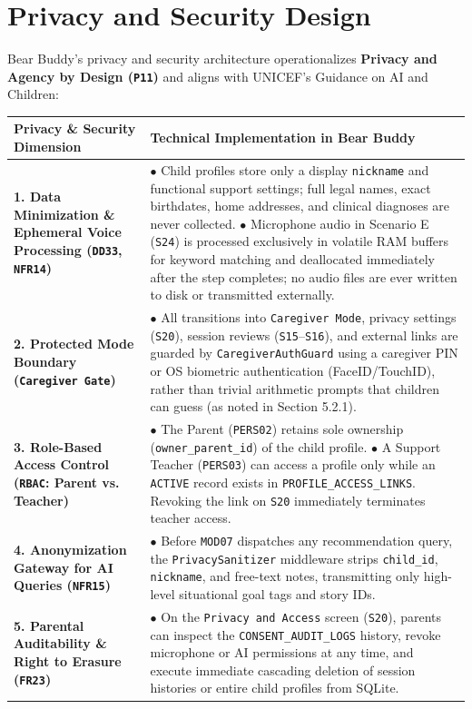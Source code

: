 \section{Privacy and Security Design}


Bear Buddy's privacy and security architecture operationalizes \textbf{Privacy and Agency by Design (\texttt{P11})} and aligns with UNICEF's Guidance on AI and Children:

\noindent\begin{xltabular}{\textwidth}{|p{4.0cm}|X|}
\hline
\textbf{Privacy \& Security Dimension} & \textbf{Technical Implementation in Bear Buddy} \\ \hline
\endhead
\textbf{1. Data Minimization \& Ephemeral Voice Processing (\texttt{DD33}, \texttt{NFR14})} & $\bullet$ Child profiles store only a display \texttt{nickname} and functional support settings; full legal names, exact birthdates, home addresses, and clinical diagnoses are never collected. \newline $\bullet$ Microphone audio in Scenario E (\texttt{S24}) is processed exclusively in volatile RAM buffers for keyword matching and deallocated immediately after the step completes; no audio files are ever written to disk or transmitted externally. \\ \hline
\textbf{2. Protected Mode Boundary (\texttt{Caregiver Gate})} & $\bullet$ All transitions into \texttt{Caregiver Mode}, privacy settings (\texttt{S20}), session reviews (\texttt{S15}–\texttt{S16}), and external links are guarded by \texttt{CaregiverAuthGuard} using a caregiver PIN or OS biometric authentication (FaceID/TouchID), rather than trivial arithmetic prompts that children can guess (as noted in Section 5.2.1). \\ \hline
\textbf{3. Role-Based Access Control (\texttt{RBAC}: Parent vs. Teacher)} & $\bullet$ The Parent (\texttt{PERS02}) retains sole ownership (\texttt{owner\_parent\_id}) of the child profile. \newline $\bullet$ A Support Teacher (\texttt{PERS03}) can access a profile only while an \texttt{ACTIVE} record exists in \texttt{PROFILE\_ACCESS\_LINKS}. Revoking the link on \texttt{S20} immediately terminates teacher access. \\ \hline
\textbf{4. Anonymization Gateway for AI Queries (\texttt{NFR15})} & $\bullet$ Before \texttt{MOD07} dispatches any recommendation query, the \texttt{PrivacySanitizer} middleware strips \texttt{child\_id}, \texttt{nickname}, and free-text notes, transmitting only high-level situational goal tags and story IDs. \\ \hline
\textbf{5. Parental Auditability \& Right to Erasure (\texttt{FR23})} & $\bullet$ On the \texttt{Privacy and Access} screen (\texttt{S20}), parents can inspect the \texttt{CONSENT\_AUDIT\_LOGS} history, revoke microphone or AI permissions at any time, and execute immediate cascading deletion of session histories or entire child profiles from SQLite. \\ \hline
\end{xltabular}
